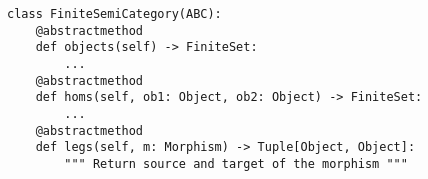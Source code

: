 \par\begin{minipage}{60ex}
\begin{verbatim}
class FiniteSemiCategory(ABC):
    @abstractmethod
    def objects(self) -> FiniteSet:
        ...
    @abstractmethod
    def homs(self, ob1: Object, ob2: Object) -> FiniteSet:
        ...
    @abstractmethod
    def legs(self, m: Morphism) -> Tuple[Object, Object]:
        """ Return source and target of the morphism """
\end{verbatim}
\end{minipage}\par